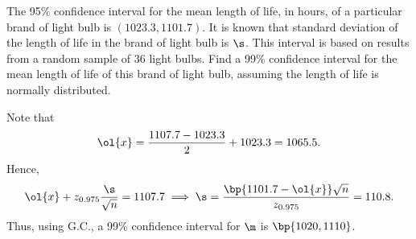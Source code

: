 \begin{problem}
    The 95\% confidence interval for the mean length of life, in hours, of a particular brand of light bulb is $(1023.3, 1101.7)$. It is known that standard deviation of the length of life in the brand of light bulb is $\s$. This interval is based on results from a random sample of 36 light bulbs. Find a 99\% confidence interval for the mean length of life of this brand of light bulb, assuming the length of life is normally distributed.
\end{problem}
\begin{solution}
    Note that \[\ol{x} = \frac{1107.7 - 1023.3}{2} + 1023.3 = 1065.5.\] Hence, \[\ol{x} + z_{0.975} \frac{\s}{\sqrt{n}} = 1107.7 \implies \s = \frac{\bp{1101.7 - \ol{x}} \sqrt{n}}{z_{0.975}} = 110.8.\] Thus, using G.C., a 99\% confidence interval for $\m$ is $\bp{1020, 1110}$.
\end{solution}

